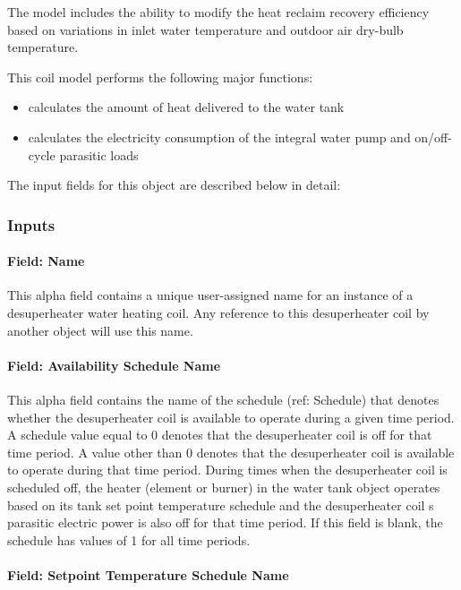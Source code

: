 The model includes the ability to modify the heat reclaim recovery efficiency based on variations in inlet water temperature and outdoor air dry-bulb temperature.

This coil model performs the following major functions:

\begin{itemize}
\item
  calculates the amount of heat delivered to the water tank
\item
  calculates the electricity consumption of the integral water pump and on/off-cycle parasitic loads
\end{itemize}

The input fields for this object are described below in detail:

\subsubsection{Inputs}\label{inputs-22-000}

\paragraph{Field: Name}\label{field-name-21-000}

This alpha field contains a unique user-assigned name for an instance of a desuperheater water heating coil. Any reference to this desuperheater coil by another object will use this name.

\paragraph{Field: Availability Schedule Name}\label{field-availability-schedule-name-12-000}

This alpha field contains the name of the schedule (ref: Schedule) that denotes whether the desuperheater coil is available to operate during a given time period. A schedule value equal to 0 denotes that the desuperheater coil is off for that time period. A value other than 0 denotes that the desuperheater coil is available to operate during that time period. During times when the desuperheater coil is scheduled off, the heater (element or burner) in the water tank object operates based on its tank set point temperature schedule and the desuperheater coil s parasitic electric power is also off for that time period. If this field is blank, the schedule has values of 1 for all time periods.

\paragraph{Field: Setpoint Temperature Schedule Name}\label{field-setpoint-temperature-schedule-name}

